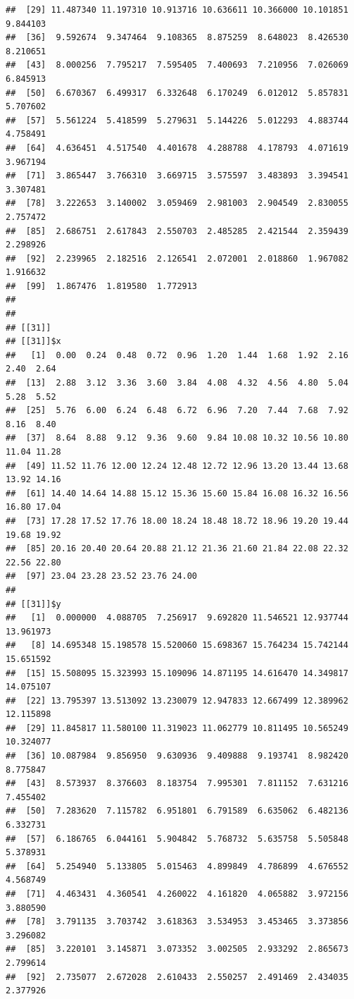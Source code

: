 \documentclass[
  ignorenonframetext,
]{beamer}
\begin{document}
\begin{frame}[fragile]{}
\begin{verbatim}
##  [29] 11.487340 11.197310 10.913716 10.636611 10.366000 10.101851  9.844103
##  [36]  9.592674  9.347464  9.108365  8.875259  8.648023  8.426530  8.210651
##  [43]  8.000256  7.795217  7.595405  7.400693  7.210956  7.026069  6.845913
##  [50]  6.670367  6.499317  6.332648  6.170249  6.012012  5.857831  5.707602
##  [57]  5.561224  5.418599  5.279631  5.144226  5.012293  4.883744  4.758491
##  [64]  4.636451  4.517540  4.401678  4.288788  4.178793  4.071619  3.967194
##  [71]  3.865447  3.766310  3.669715  3.575597  3.483893  3.394541  3.307481
##  [78]  3.222653  3.140002  3.059469  2.981003  2.904549  2.830055  2.757472
##  [85]  2.686751  2.617843  2.550703  2.485285  2.421544  2.359439  2.298926
##  [92]  2.239965  2.182516  2.126541  2.072001  2.018860  1.967082  1.916632
##  [99]  1.867476  1.819580  1.772913
## 
## 
## [[31]]
## [[31]]$x
##   [1]  0.00  0.24  0.48  0.72  0.96  1.20  1.44  1.68  1.92  2.16  2.40  2.64
##  [13]  2.88  3.12  3.36  3.60  3.84  4.08  4.32  4.56  4.80  5.04  5.28  5.52
##  [25]  5.76  6.00  6.24  6.48  6.72  6.96  7.20  7.44  7.68  7.92  8.16  8.40
##  [37]  8.64  8.88  9.12  9.36  9.60  9.84 10.08 10.32 10.56 10.80 11.04 11.28
##  [49] 11.52 11.76 12.00 12.24 12.48 12.72 12.96 13.20 13.44 13.68 13.92 14.16
##  [61] 14.40 14.64 14.88 15.12 15.36 15.60 15.84 16.08 16.32 16.56 16.80 17.04
##  [73] 17.28 17.52 17.76 18.00 18.24 18.48 18.72 18.96 19.20 19.44 19.68 19.92
##  [85] 20.16 20.40 20.64 20.88 21.12 21.36 21.60 21.84 22.08 22.32 22.56 22.80
##  [97] 23.04 23.28 23.52 23.76 24.00
## 
## [[31]]$y
##   [1]  0.000000  4.088705  7.256917  9.692820 11.546521 12.937744 13.961973
##   [8] 14.695348 15.198578 15.520060 15.698367 15.764234 15.742144 15.651592
##  [15] 15.508095 15.323993 15.109096 14.871195 14.616470 14.349817 14.075107
##  [22] 13.795397 13.513092 13.230079 12.947833 12.667499 12.389962 12.115898
##  [29] 11.845817 11.580100 11.319023 11.062779 10.811495 10.565249 10.324077
##  [36] 10.087984  9.856950  9.630936  9.409888  9.193741  8.982420  8.775847
##  [43]  8.573937  8.376603  8.183754  7.995301  7.811152  7.631216  7.455402
##  [50]  7.283620  7.115782  6.951801  6.791589  6.635062  6.482136  6.332731
##  [57]  6.186765  6.044161  5.904842  5.768732  5.635758  5.505848  5.378931
##  [64]  5.254940  5.133805  5.015463  4.899849  4.786899  4.676552  4.568749
##  [71]  4.463431  4.360541  4.260022  4.161820  4.065882  3.972156  3.880590
##  [78]  3.791135  3.703742  3.618363  3.534953  3.453465  3.373856  3.296082
##  [85]  3.220101  3.145871  3.073352  3.002505  2.933292  2.865673  2.799614
##  [92]  2.735077  2.672028  2.610433  2.550257  2.491469  2.434035  2.377926

\end{verbatim}
\end{frame}
\end{document}
